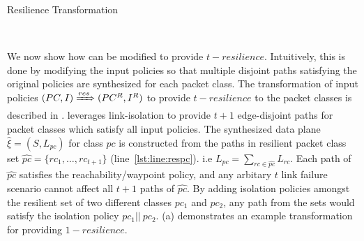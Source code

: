 \begin{algorithm}[h]
	\begin{footnotesize}
		\caption{Resilience Transformation}
		\label{restransform}
		\begin{algorithmic}[1]
			\vspace*{0.25cm}
			 \label{lst:line:respc}
			 \label{lst:line:respcend}
			\EndFor
			 \label{lst:line:respolicy}
			\EndFor \\
		\end{algorithmic}
	\end{footnotesize}
\end{algorithm}

 We now show how \Name can be modified to provide $t-resilience$.
Intuitively, this  is done by modifying the input policies so that  multiple disjoint paths satisfying the original
policies are synthesized for each packet class.
 The transformation of input policies $(PC, I) \xRightarrow{res} (PC^R, I^R)$ to provide $t-resilience$ to the packet classes is described in . 
\name leverages link-isolation to provide $t+1$ edge-disjoint paths for packet classes which satisfy all input policies.  
The synthesized data plane $\hat{\xi} = (S, L_{pc})$ for class $pc$ is constructed from the 
paths in resilient packet class set $\hat{pc} = \{rc_1,\ldots,rc_{t+1}\}$ (line~\ref{lst:line:respc}).
i.e $L_{pc} = \sum\limits_{rc \in \hat{pc}} L_{rc}$. 
Each path of $\hat{pc}$ satisfies the reachability/waypoint policy, and any arbitary $t$ link failure scenario cannot affect all $t+1$ paths of $\hat{pc}$.
By adding isolation policies amongst the resilient set of two different classes $pc_1$ and $pc_2$, any path from the sets
would satisfy the isolation policy $pc_1 || \ pc_2$.
(a) demonstrates an example transformation for providing $1-resilience$. 

